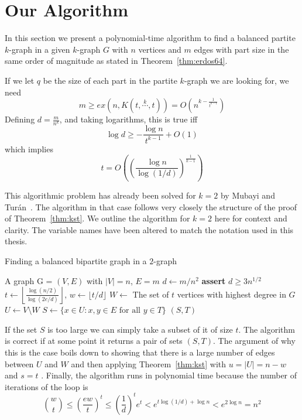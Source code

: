 \section{Our Algorithm}\label{sec:algorithm}

In this section we present a polynomial-time algorithm to find a balanced partite $k$-graph in a given $k$-graph $G$
with $n$ vertices and $m$ edges with part size in the same order of magnitude as stated in
Theorem~\ref{thm:erdos64}.

\begin{remark}
    If we let $q$ be the size of each part in the partite $k$-graph we are looking for, we need
    \[
        m \geq ex(n, K(t, \overset{k}{\cdots}, t)) = O\left(n^{k - \frac{1}{t^{k-1}}}\right)
    \]
    Defining $d = \frac{m}{n^k}$, and taking logarithms, this is true iff
    \[
        \log d \geq - \frac{\log n}{t^{k-1}} + O(1)
    \]
    which implies
    \[
        t = O\left(\left(\frac{\log n}{\log (1/d)}\right)^{\frac{1}{k-1}}\right)
    \]
\end{remark}

This algorithmic problem has already been solved for $k = 2$ by Mubayi and Turán~\cite{MUBAYI2010174}.
The algorithm in that case follows very closely the structure of the proof of Theorem~\ref{thm:kst}.
We outline the algorithm for $k = 2$ here for context and clarity.
The variable names have been altered to match the notation used in this thesis.

\begin{algorithm}
    \caption{Finding a balanced bipartite graph in a $2$-graph}
    \label{alg:bipartite}
        \begin{algorithmic}[1]
        \Require A graph G = $(V, E)$ with $|V| = n$, $E = m$
        \State $d \gets m / n^2 $
        \State \textbf{assert} $d \geq 3 n^{1/2}$
        \State $t \gets \left\lfloor\frac{\log (n/2) }{\log (2e/d)}\right\rfloor,\, w \gets \lfloor t/d \rfloor$
        \State $W \gets $ The set of $t$ vertices with highest degree in $G$
        \State $U \gets V \setminus W$
            \State $S \gets \{x \in U : {x, y} \in E \text{ for all } y \in T\}$
                \State \Return $(S, T)$
            \EndIf
        \EndFor
        \end{algorithmic}
\end{algorithm}

If the set $S$ is too large we can simply take a subset of it of size $t$.
The algorithm is correct if at some point it returns a pair of sets $(S, T)$.
The argument of why this is the case boils down to showing that there is a
large number of edges between $U$ and $W$ and then applying Theorem~\ref{thm:kst}
with $u = |U| = n - w$ and $s = t$ .
Finally, the algorithm runs in polynomial time because 
the  number of iterations of the loop is
\[
    \binom{w}{t} \leq \left(\frac{ew}{t}\right)^t \leq \left(\frac{1}{d}\right)^t e^t < e^{t \log (1/d) + \log n} < e^{2\log n} = n^2
\]

